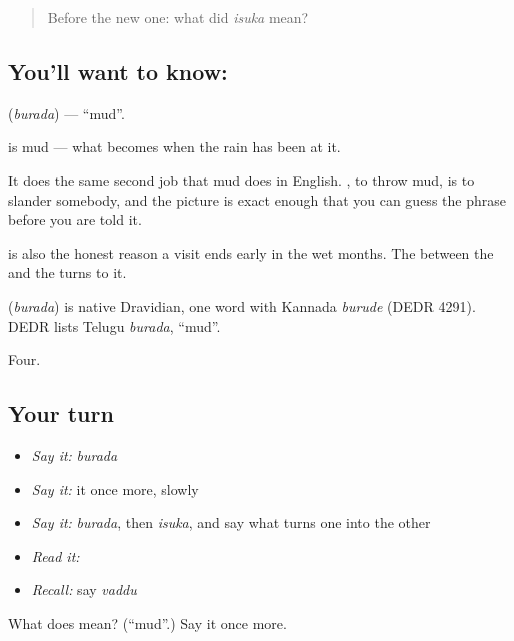 \begin{quote}
Before the new one: what did \emph{isuka} mean?
\end{quote}

\subsection*{You'll want to know: }
\textbf{} (\emph{burada}) — \textquotedblleft{}mud\textquotedblright{}.

 is mud — what  becomes when the rain has been at it.

It does the same second job that mud does in English.  , to throw mud, is to slander somebody, and the picture is exact enough that you can guess the phrase before you are told it.

 is also the honest reason a visit ends early in the wet months. The  between the  and the  turns to it.

\begin{cousinweb}
\textbf{} (\emph{burada}) is native Dravidian, one word with Kannada \emph{burude} (DEDR 4291). DEDR lists Telugu \emph{burada}, \textquotedblleft{}mud\textquotedblright{}.
\end{cousinweb}

\begin{grammarlens}[title={What you've built}]
Four.
\end{grammarlens}

\subsection*{Your turn}
\begin{itemize}
\raggedright
  \item \emph{Say it:} \emph{burada}
  \item \emph{Say it:} it once more, slowly
  \item \emph{Say it:} \emph{burada}, then \emph{isuka}, and say what turns one into the other
  \item \emph{Read it:} \textbf{}
  \item \emph{Recall:} say \emph{vaddu}
\end{itemize}

\begin{tcolorbox}[breakable,colback=teal!4,colframe=teal!35!black,title={Before you move on}]
What does  mean? (\textquotedblleft{}mud\textquotedblright{}.) Say it once more.
\end{tcolorbox}
